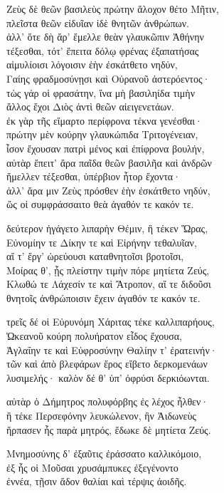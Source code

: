 \quad{}Ζεὺς δὲ θεῶν βασιλεὺς πρώτην ἄλοχον θέτο Μῆτιν, \\
πλεῖστα θεῶν εἰδυῖαν ἰδὲ θνητῶν ἀνθρώπων. \\
ἀλλ' ὅτε δὴ ἄρ' ἔμελλε θεὰν γλαυκῶπιν Ἀθήνην\\
τέξεσθαι, τότ' ἔπειτα δόλῳ φρένας ἐξαπατήσας\\
αἱμυλίοισι λόγοισιν ἑὴν ἐσκάτθετο νηδύν,  \\
Γαίης φραδμοσύνῃσι καὶ Οὐρανοῦ ἀστερόεντος· \\
τὼς γάρ οἱ φρασάτην, ἵνα μὴ βασιληίδα τιμὴν\\
ἄλλος ἔχοι Διὸς ἀντὶ θεῶν αἰειγενετάων.\\
ἐκ γὰρ τῆς εἵμαρτο περίφρονα τέκνα γενέσθαι· \\
πρώτην μὲν κούρην γλαυκώπιδα Τριτογένειαν, \\
ἶσον ἔχουσαν πατρὶ μένος καὶ ἐπίφρονα βουλήν,\\
αὐτὰρ ἔπειτ' ἄρα παῖδα θεῶν βασιλῆα καὶ ἀνδρῶν\\
ἤμελλεν τέξεσθαι, ὑπέρβιον ἦτορ ἔχοντα·\\
ἀλλ' ἄρα μιν Ζεὺς πρόσθεν ἑὴν ἐσκάτθετο νηδύν,\\
ὥς οἱ συμφράσσαιτο θεὰ ἀγαθόν τε κακόν τε. 

\quad{}δεύτερον ἠγάγετο λιπαρὴν Θέμιν, ἣ τέκεν Ὥρας,\\
Εὐνομίην τε Δίκην τε καὶ Εἰρήνην τεθαλυῖαν,\\
αἵ τ' ἔργ' ὠρεύουσι καταθνητοῖσι βροτοῖσι,\\
Μοίρας θ', ᾗς πλείστην τιμὴν πόρε μητίετα Ζεύς, \\
Κλωθώ τε Λάχεσίν τε καὶ Ἄτροπον, αἵ τε διδοῦσι  \\
θνητοῖς ἀνθρώποισιν ἔχειν ἀγαθόν τε κακόν τε.

\quad{}τρεῖς δέ οἱ Εὐρυνόμη Χάριτας τέκε καλλιπαρήους,\\
Ὠκεανοῦ κούρη πολυήρατον εἶδος ἔχουσα,\\
Ἀγλαΐην τε καὶ Εὐφροσύνην Θαλίην τ' ἐρατεινήν·\\
τῶν καὶ ἀπὸ βλεφάρων ἔρος εἴβετο δερκομενάων \\
λυσιμελής· καλὸν δέ θ' ὑπ' ὀφρύσι δερκιόωνται. 

\quad{}αὐτὰρ ὁ Δήμητρος πολυφόρβης ἐς λέχος ἦλθεν· \\
ἣ τέκε Περσεφόνην λευκώλενον, ἣν Ἀιδωνεὺς\\
ἥρπασεν ἧς παρὰ μητρός, ἔδωκε δὲ μητίετα Ζεύς. 

\quad{}Μνημοσύνης δ' ἐξαῦτις ἐράσσατο καλλικόμοιο,  \\
ἐξ ἧς οἱ Μοῦσαι χρυσάμπυκες ἐξεγένοντο\\
ἐννέα, τῇσιν ἅδον θαλίαι καὶ τέρψις ἀοιδῆς.

